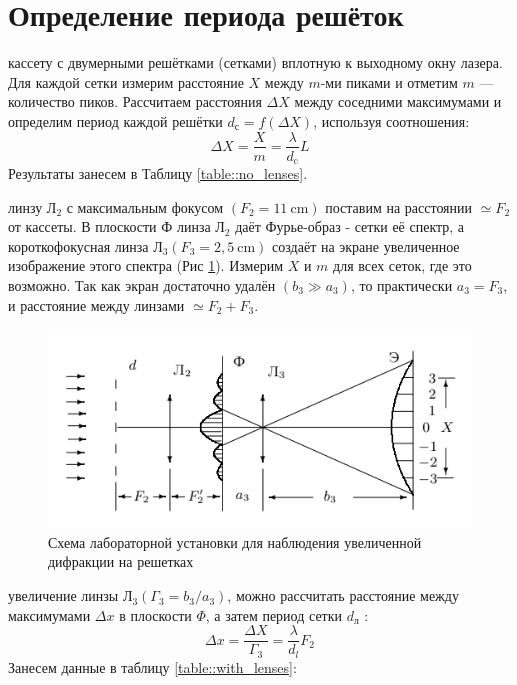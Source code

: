 \documentclass[a4paper,12pt]{article}
\begin{document}
\section*{Определение периода решёток}

\begin{enumerate}
     кассету с двумерными решётками (сетками) вплотную к выходному окну лазера. Для каждой сетки измерим расстояние $X$ между $m$-ми пиками и отметим $m$ — количество пиков. Рассчитаем расстояния $\Delta X$ между соседними максимумами и определим период каждой решётки $d_с = f(\Delta X)$, используя соотношения:
        \begin{equation*}
            \Delta X=\frac{X}{m}=\frac{\lambda}{d_{\mathrm{c}}} L
        \end{equation*}
        Результаты занесем в Таблицу \ref{table::no_lenses}.
    
         линзу Л$_{2}$ с максимальным фокусом $\left(F_{2} = 11 \mathrm{~cm}\right)$ поставим на расстоянии $\simeq F_{2}$ от кассеты. В плоскости Ф линза Л$_{2}$ даёт Фурье-образ - сетки её спектр, а короткофокусная линза Л$_{3}\left(F_{3} = 2,5 \mathrm{~cm}\right)$ создаёт на экране увеличенное изображение этого спектра (Рис \ref{fig:scheme_III}).
        Измерим $X$ и $m$ для всех сеток, где это возможно. Так как экран достаточно удалён $\left(b_{3} \gg a_{3}\right)$, то практически $a_{3}=F_{3}$, и расстояние между линзами $\simeq F_{2}+F_{3} .$
        
        \begin{figure}[h]
            \centering
            \includegraphics[width=15cm]{scheme_III.png}
            \caption{Схема лабораторной установки для наблюдения увеличенной дифракции на решетках}
            \label{fig:scheme_III}
        \end{figure}

         увеличение линзы ${Л_{3}}\left(\Gamma_{3}=b_{3} / a_{3}\right)$, можно рассчитать расстояние между максимумами $\Delta x$ в плоскости $\Phi$, а затем период сетки $d_{л}$ :
        $$
        \Delta x=\frac{\Delta X}{\Gamma_{3}}=\frac{\lambda}{d_{l}} F_{2}
        $$
        Занесем данные в таблицу \ref{table::with_lenses}:
\end{enumerate}
\end{document}
